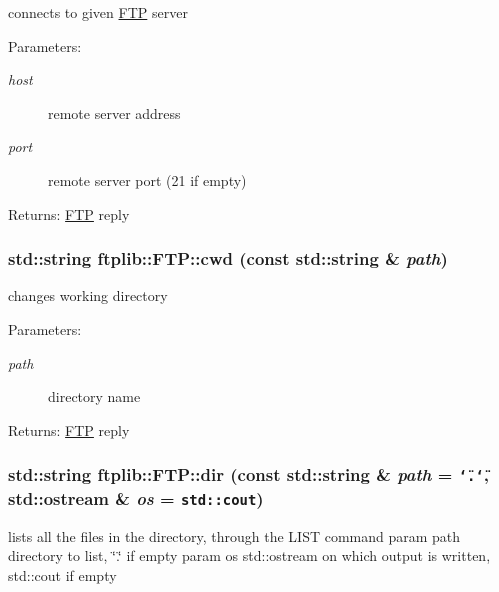 connects to given \hyperlink{classftplib_1_1FTP}{FTP} server 

\begin{Desc}
\item[Parameters:]
\begin{description}
\item[{\em host}]remote server address \item[{\em port}]remote server port (21 if empty) \end{description}
\end{Desc}
\begin{Desc}
\item[Returns:]\hyperlink{classftplib_1_1FTP}{FTP} reply \end{Desc}
\hypertarget{classftplib_1_1FTP_7cd3c7fc71ae0c7dbdfcee88417d2685}{
\subsubsection[{cwd}]{\setlength{\rightskip}{0pt plus 5cm}std::string ftplib::FTP::cwd (const std::string \& {\em path})}}
\label{classftplib_1_1FTP_7cd3c7fc71ae0c7dbdfcee88417d2685}


changes working directory 

\begin{Desc}
\item[Parameters:]
\begin{description}
\item[{\em path}]directory name \end{description}
\end{Desc}
\begin{Desc}
\item[Returns:]\hyperlink{classftplib_1_1FTP}{FTP} reply \end{Desc}
\hypertarget{classftplib_1_1FTP_42749c4425e33349f605ec0a8b389731}{
\subsubsection[{dir}]{\setlength{\rightskip}{0pt plus 5cm}std::string ftplib::FTP::dir (const std::string \& {\em path} = {\tt \char`\"{}.\char`\"{}}, \/  std::ostream \& {\em os} = {\tt std::cout})}}
\label{classftplib_1_1FTP_42749c4425e33349f605ec0a8b389731}


lists all the files in the directory, through the LIST command param path directory to list, \char`\"{}.\char`\"{} if empty param os std::ostream on which output is written, std::cout if empty 


